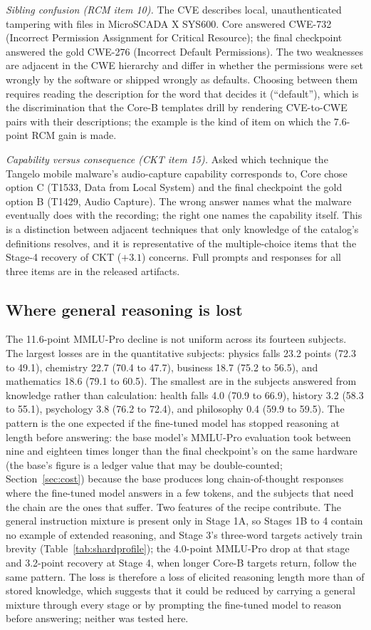 \documentclass[twocolumn]{svjour3}
\begin{document}
\emph{Sibling confusion (RCM item 10).} The CVE describes local, unauthenticated tampering with files in MicroSCADA X SYS600. Core answered CWE-732 (Incorrect Permission Assignment for Critical Resource); the final checkpoint answered the gold CWE-276 (Incorrect Default Permissions). The two weaknesses are adjacent in the CWE hierarchy and differ in whether the permissions were set wrongly by the software or shipped wrongly as defaults. Choosing between them requires reading the description for the word that decides it (``default''), which is the discrimination that the Core-B templates drill by rendering CVE-to-CWE pairs with their descriptions; the example is the kind of item on which the 7.6-point RCM gain is made.

\emph{Capability versus consequence (CKT item 15).} Asked which technique the Tangelo mobile malware's audio-capture capability corresponds to, Core chose option C (T1533, Data from Local System) and the final checkpoint the gold option B (T1429, Audio Capture). The wrong answer names what the malware eventually does with the recording; the right one names the capability itself. This is a distinction between adjacent techniques that only knowledge of the catalog's definitions resolves, and it is representative of the multiple-choice items that the Stage-4 recovery of CKT ($+3.1$) concerns. Full prompts and responses for all three items are in the released artifacts.

\subsection{Where general reasoning is lost}\label{sec:mmlu}
The 11.6-point MMLU-Pro decline is not uniform across its fourteen subjects. The largest losses are in the quantitative subjects: physics falls 23.2 points (72.3 to 49.1), chemistry 22.7 (70.4 to 47.7), business 18.7 (75.2 to 56.5), and mathematics 18.6 (79.1 to 60.5). The smallest are in the subjects answered from knowledge rather than calculation: health falls 4.0 (70.9 to 66.9), history 3.2 (58.3 to 55.1), psychology 3.8 (76.2 to 72.4), and philosophy 0.4 (59.9 to 59.5). The pattern is the one expected if the fine-tuned model has stopped reasoning at length before answering: the base model's MMLU-Pro evaluation took between nine and eighteen times longer than the final checkpoint's on the same hardware (the base's figure is a ledger value that may be double-counted; Section~\ref{sec:cost}) because the base produces long chain-of-thought responses where the fine-tuned model answers in a few tokens, and the subjects that need the chain are the ones that suffer. Two features of the recipe contribute. The general instruction mixture is present only in Stage 1A, so Stages 1B to 4 contain no example of extended reasoning, and Stage 3's three-word targets actively train brevity (Table~\ref{tab:shardprofile}); the 4.0-point MMLU-Pro drop at that stage and 3.2-point recovery at Stage 4, when longer Core-B targets return, follow the same pattern. The loss is therefore a loss of elicited reasoning length more than of stored knowledge, which suggests that it could be reduced by carrying a general mixture through every stage or by prompting the fine-tuned model to reason before answering; neither was tested here.
\end{document}
